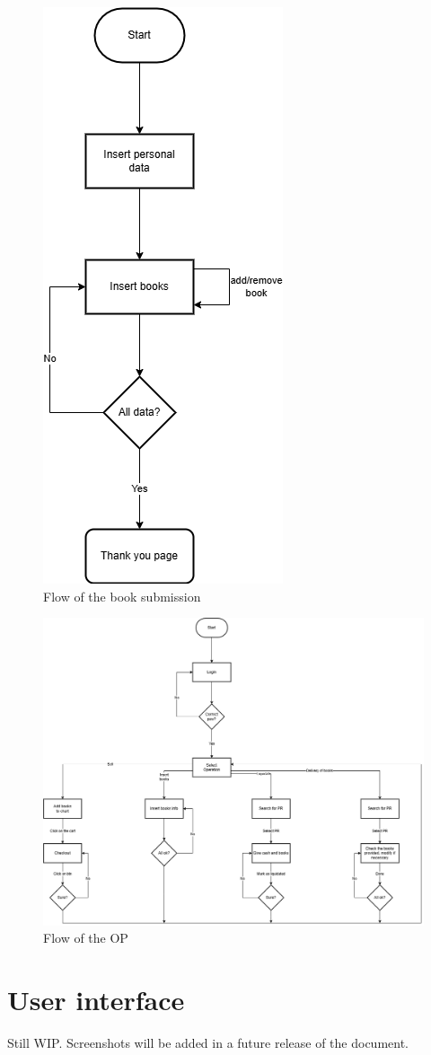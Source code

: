 \begin{figure}[ht]
    \centering
    \includegraphics[width=.25\textwidth]{assets/flow_book_submission.png}
    \caption{Flow of the book submission}
    \label{fig:flow_book_submission}
\end{figure}

\begin{figure}[ht]
    \centering
    \includegraphics[width=\textwidth]{assets/flow_op.png}
    \caption{Flow of the OP}
    \label{fig:flow_op}
\end{figure}

\section{User interface}

Still WIP. Screenshots will be added in a future release of the document.